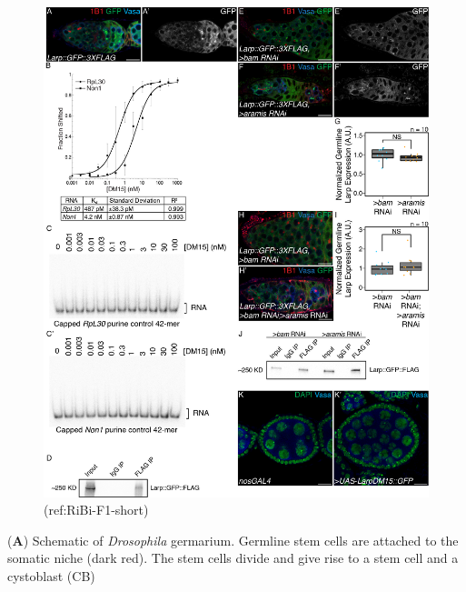 \documentclass[12pt,oneside]{reedthesis}
\begin{document}
\begin{figure}

{\centering \includegraphics[width=6.5 in,height=8.9375 in]{./figure/Ribosome Biogenesis/Ribosome Biogenesis 7S} 

}

\caption[(ref:RiBi-F1-short)]{(ref:RiBi-F1-short)}\label{fig:unnamed-chunk-19}
\end{figure}
(\textbf{A}) Schematic of \emph{Drosophila} germarium.
Germline stem cells are attached to the somatic niche (dark red). The
stem cells divide and give rise to a stem cell and a cystoblast (CB)
\end{document}
